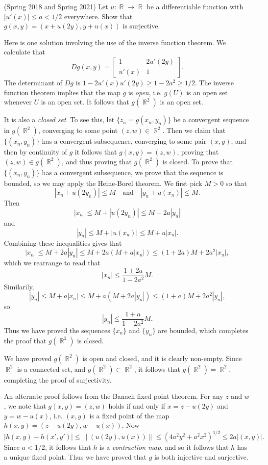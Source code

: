 \documentclass[answers]{exam}
\DeclareMathOperator{\RR}{\mathbb{R}}
\begin{document}
\begin{questions}
	\question (Spring 2018 and Spring 2021)
	Let $u: \RR \to \RR$ be a differentiable function with $|u'(x)| \leq a < 1/2$ everywhere. Show that $g(x,y)	= (x + u(2y), y + u(x))$ is surjective.
\begin{solution}
	Here is one solution involving the use of the inverse function theorem. We calculate that
	\[ Dg(x,y) = \begin{bmatrix} 1 & 2u'(2y) \\ u'(x) & 1 \end{bmatrix}. \]
	The determinant of $Dg$ is $1 - 2 u'(x) u'(2y) \geq 1 - 2 a^2 \geq 1/2$. The inverse function theorem implies that the map $g$ is \emph{open}, i.e. $g(U)$ is an open set whenever $U$ is an open set. It follows that $g(\RR^2)$ is an open set.

	It is also a \emph{closed set}. To see this, let $\{ z_n = g(x_n,y_n) \}$ be a convergent sequence in $g(\RR^2)$, converging to some point $(z,w) \in \RR^2$. Then we claim that $\{ (x_n,y_n) \}$ has a convergent subsequence, converging to some pair $(x,y)$, and then by continuity of $g$ it follows that $g(x,y) = (z,w)$, proving that $(z,w) \in g(\RR^2)$, and thus proving that $g(\RR^2)$ is closed. To prove that $\{ (x_n,y_n) \}$ has a convergent subsequence, we prove that the sequence is bounded, so we may apply the Heine-Borel theorem. We first pick $M > 0$ so that
	\[ |x_n + u(2y_n)| \leq M \quad\text{and}\quad |y_n + u(x_n)| \leq M. \]
	Then
	\[ |x_n| \leq M + |u(2y_n)| \leq M + 2a |y_n| \]
	and
	\[ |y_n| \leq M + |u(x_n)| \leq M + a |x_n|. \]
	Combining these inequalities gives that
	\[ |x_n| \leq M + 2 a | y_n| \leq M + 2a ( M + a |x_n| ) \leq (1 + 2a) M + 2a^2 |x_n|, \]
	which we rearrange to read that
	\[ |x_n| \leq \frac{1 + 2a}{1 - 2a^2} M. \]
	Similarily,
	\[ |y_n| \leq M + a |x_n| \leq M + a ( M + 2 a |y_n| ) \leq (1 + a) M + 2a^2 |y_n|, \]
	so
	\[ |y_n| \leq \frac{1 + a}{1 - 2a^2} M. \]
	Thus we have proved the sequences $\{ x_n \}$ and $\{ y_n \}$ are bounded, which completes the proof that $g(\RR^2)$ is closed.

	We have proved $g(\RR^2)$ is open and closed, and it is clearly non-empty. Since $\RR^2$ is a connected set, and $g(\RR^2) \subset \RR^2$, it follows that $g(\RR^2) = \RR^2$, completing the proof of surjectivity.

	An alternate proof follows from the Banach fixed point theorem. For any $z$ and $w$, we note that $g(x,y) = (z,w)$ holds if and only if $x = z - u(2y)$ and $y = w - u(x)$, i.e. $(x,y)$ is a fixed point of the map $h(x,y) = (z - u(2y), w - u(x))$. Now
	\[ |h(x,y) - h(x',y')| \leq \| ( u(2y), u(x) ) \| \leq ( 4 a^2 y^2 + a^2 x^2 )^{1/2} \leq 2a |(x,y)|. \]
	Since $a < 1/2$, it follows that $h$ is a \emph{contraction map}, and so it follows that $h$ has a unique fixed point. Thus we have proved that $g$ is both injective and surjective.


\end{solution}
\end{questions}
\end{document}
